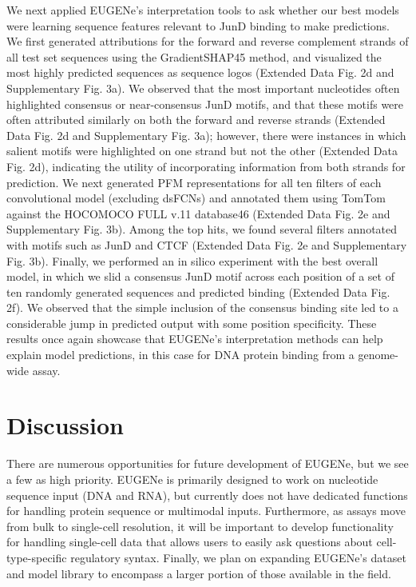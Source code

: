 We next applied EUGENe’s interpretation tools to ask whether our best models were learning sequence features relevant to JunD binding to make predictions. We first generated attributions for the forward and reverse complement strands of all test set sequences using the GradientSHAP45 method, and visualized the most highly predicted sequences as sequence logos (Extended Data Fig. 2d and Supplementary Fig. 3a). We observed that the most important nucleotides often highlighted consensus or near-consensus JunD motifs, and that these motifs were often attributed similarly on both the forward and reverse strands (Extended Data Fig. 2d and Supplementary Fig. 3a); however, there were instances in which salient motifs were highlighted on one strand but not the other (Extended Data Fig. 2d), indicating the utility of incorporating information from both strands for prediction. We next generated PFM representations for all ten filters of each convolutional model (excluding dsFCNs) and annotated them using TomTom against the HOCOMOCO FULL v.11 database46 (Extended Data Fig. 2e and Supplementary Fig. 3b). Among the top hits, we found several filters annotated with motifs such as JunD and CTCF (Extended Data Fig. 2e and Supplementary Fig. 3b). Finally, we performed an in silico experiment with the best overall model, in which we slid a consensus JunD motif across each position of a set of ten randomly generated sequences and predicted binding (Extended Data Fig. 2f). We observed that the simple inclusion of the consensus binding site led to a considerable jump in predicted output with some position specificity. These results once again showcase that EUGENe’s interpretation methods can help explain model predictions, in this case for DNA protein binding from a genome-wide assay.

\section{Discussion}

There are numerous opportunities for future development of EUGENe, but we see a few as high priority. EUGENe is primarily designed to work on nucleotide sequence input (DNA and RNA), but currently does not have dedicated functions for handling protein sequence or multimodal inputs. Furthermore, as assays move from bulk to single-cell resolution, it will be important to develop functionality for handling single-cell data that allows users to easily ask questions about cell-type-specific regulatory syntax. Finally, we plan on expanding EUGENe’s dataset and model library to encompass a larger portion of those available in the field.

